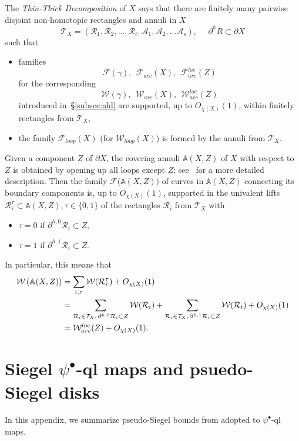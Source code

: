 \documentclass[11pt, reqno]{amsart}
\numberwithin{equation}{section}
\theoremstyle{plain}
\theoremstyle{theorem}
\theoremstyle{plain}
\theoremstyle{definition}
\numberwithin{figure}{section}
\renewcommand{\sp}{{\ \ }}
\newcommand{\Fam}{{\mathcal F}}
\newcommand{\Width}{{\mathcal W}}
\newcommand\RR{\mathcal{R}}
\begin{document}
The \emph{Thin-Thick Decomposition} of $X$ says that there are finitely many pairwise disjoint non-homotopic rectangles and annuli in $X$ 
\[ \mathcal T _X = (\RR_1,\RR_2,\dots, \RR_t, \mathcal{A}_1,\mathcal{A}_2,\dots \mathcal{A}_s), \sp\sp\sp \partial^h R\subset \partial X\] such that
\begin{itemize}
    \item families \[\Fam(\gamma), \sp \Fam_{arc}(X), \sp \Fam^{loc}_{arc}(Z)\] for the corresponding 
\[\Width(\gamma), \sp \Width_{arc}(X), \sp \Width^{loc}_{arc}(Z)\] 
introduced in~\S\ref{subsec:ald} are supported, up to $O_{\chi(X)}(1)$, within finitely rectangles from $\mathcal T _X$,
\item the family $\Fam_{loop}(X)$ (for $\Width_{loop}(X)$) is formed by the annuli from $\mathcal T _X$.
\end{itemize}



Given a component $Z$ of $\partial X$, the covering annuli $\mathbb A(X, Z)$ of $X$ with respect to $Z$ is obtained by opening up all loops except $Z$; see~\cite[\S 3.3.3]{DL23} for a more detailed description. Then the family $\Fam\big(\mathbb A(X, Z)\big)$ of curves in $\mathbb A(X, Z)$ connecting its boundary components is, up to $O_{\chi(X)}(1)$, supported in the univalent lifts $\RR_i^\tau \subset \mathbb A(X, Z), \tau \in \{0,1\}$ of the rectangles $\RR_i$ from $\mathcal T_X$ with
\begin{itemize}
    \item $\tau=0$ if $\partial^{h,0}\RR_i \subset Z$,
    \item  $\tau=1$ if $\partial^{h,1}\RR_i \subset Z$.
\end{itemize}
In particular, this means that 
\begin{align}
\label{eq:AC}
\Width \left( \mathbb A(X, Z)\right) &= \sum_{i, \tau} \Width(\RR_i^\tau) + O_{\chi(X)}(1) \\
\notag &= \sum_{\RR_i \in \mathcal T_X, \, \partial^{h,0}\RR_i \subset Z} \Width(\RR_i) + \sum_{\RR_i \in \mathcal T_X, \, \partial^{h,1}\RR_i \subset Z} \Width(\RR_i) + O_{\chi(X)}(1)\\
\notag &= \mathcal{W}^{loc}_{arc}(Z) + O_{\chi(X)}(1).
\end{align}



\section{Siegel $\psi^\bullet$-ql maps and psuedo-Siegel disks}\label{ap:psd}
In this appendix, we summarize pseudo-Siegel bounds from \cite{DL22, DLL25} adopted to $\psi^\bullet$-ql maps. 
\end{document}
